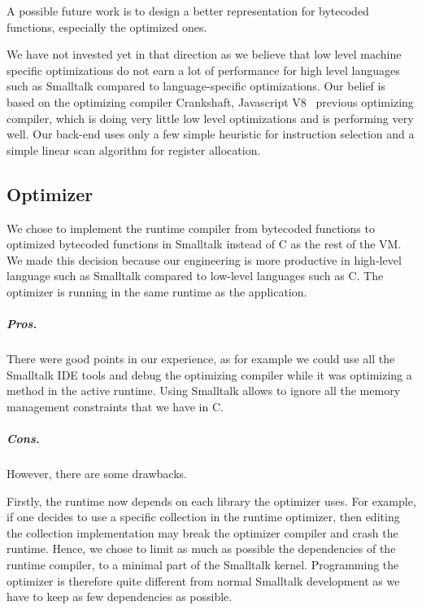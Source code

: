 \documentclass[a4paper,12pt,twoside]{../includes/ThesisStyle}
\begin{document}
A possible future work  is to design a better representation for bytecoded functions, especially the optimized ones. %

We have not invested yet in that direction as we believe that low level machine specific optimizations do not earn a lot of performance for high level languages such as Smalltalk compared to language-specific optimizations. Our belief is based on the optimizing compiler Crankshaft, Javascript V8~\cite{V8} previous optimizing compiler, which is doing very little low level optimizations and is performing very well. Our back-end uses only a few simple heuristic for instruction selection and a simple linear scan algorithm for register allocation. 

\subsection{Optimizer}

We chose to implement the runtime compiler from bytecoded functions to optimized bytecoded functions in Smalltalk instead of C as the rest of the VM. We made this decision because our engineering is more productive in high-level language such as Smalltalk compared to low-level languages such as C. The optimizer is running in the same runtime as the application.

\subparagraph{Pros.} There were good points in our experience, as for example we could use all the Smalltalk IDE tools and debug the optimizing compiler while it was optimizing a method in the active runtime. Using Smalltalk allows to ignore all the memory management constraints that we have in C.

\subparagraph{Cons.} However, there are some drawbacks. 

Firstly, the runtime now depends on each library the optimizer uses. For example, if one decides to use a specific collection in the runtime optimizer, then editing the collection implementation may break the optimizer compiler and crash the runtime. Hence, we chose to limit as much as possible the dependencies of the runtime compiler, to a minimal part of the Smalltalk kernel. Programming the optimizer is therefore quite different from normal Smalltalk development as we have to keep as few dependencies as possible.
\end{document}
